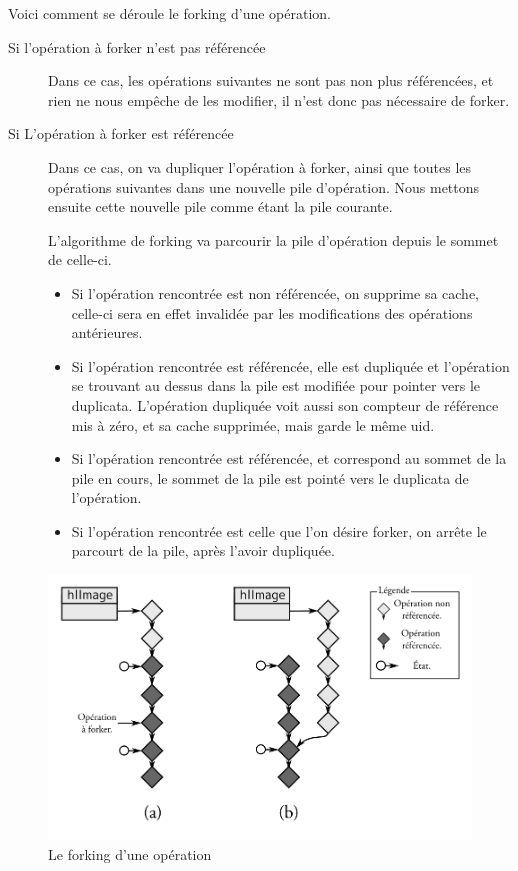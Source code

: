 			Voici comment se déroule le forking d'une opération.
			\begin{description}
				\item[Si l'opération à forker n'est pas référencée] Dans ce cas, les opérations suivantes ne sont pas non plus référencées,
				et rien ne nous empêche de les modifier, il n'est donc pas nécessaire de forker.
				\item[Si L'opération à forker est référencée] Dans ce cas, on va dupliquer l'opération à forker, ainsi que toutes les 
				opérations suivantes dans une nouvelle pile d'opération. Nous mettons ensuite cette nouvelle pile comme étant la pile
				courante.
				
				L'algorithme de forking va parcourir la pile d'opération 
				depuis le sommet de celle-ci. 
				\begin{itemize}
					\item Si l'opération rencontrée est non référencée, on supprime sa cache, celle-ci sera en effet
				invalidée par les modifications des opérations antérieures. 
					\item Si l'opération rencontrée est référencée, elle est dupliquée et l'opération se trouvant 
					au dessus dans la pile est modifiée pour pointer vers le duplicata. L'opération dupliquée voit 
					aussi son compteur de référence mis à zéro, et sa cache supprimée, mais garde le même uid.
					\item Si l'opération rencontrée est référencée, et correspond au sommet de la pile en cours, le
					sommet de la pile est pointé vers le duplicata de l'opération.
					\item Si l'opération rencontrée est celle que l'on désire forker, on arrête le parcourt de la pile,
					après l'avoir dupliquée.
				\end{itemize}
			\end{description}

		\begin{figure}[ht]
			\centering
			\includegraphics[width=\textwidth]{images/forking} 
			\caption{Le forking d'une opération}
			\label{fig:forking}
		\end{figure}

